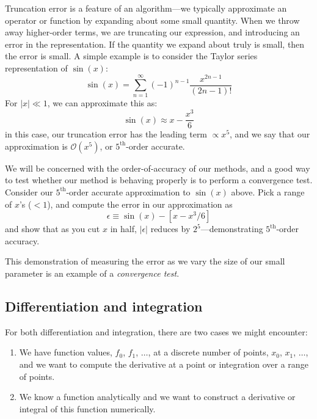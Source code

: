 Truncation error is a feature of an algorithm---we typically
approximate an operator or function by expanding about some small
quantity.  When we throw away higher-order terms, we are truncating
our expression, and introducing an error in the representation.  If
the quantity we expand about truly is small, then the error is small.
A simple example is to consider the Taylor series representation of
$\sin(x)$:
\begin{equation}
\sin(x) = \sum_{n=1}^\infty (-1)^{n-1} \frac{x^{2n-1}}{(2n-1)!}
\end{equation}
For $|x| \ll 1$, we can approximate this as:
\begin{equation}
\sin(x) \approx x - \frac{x^3}{6}
\end{equation}
in this case, our truncation error has the leading term $\propto x^5$,
and we say that our approximation is $\mathcal{O}(x^5)$, or
$5^\mathrm{th}$-order accurate.

\begin{exercise}
We will be concerned with the order-of-accuracy of our methods, and a
good way to test whether our method is behaving properly is to perform
a convergence test.  Consider our $5^\mathrm{th}$-order accurate
approximation to $\sin(x)$ above.  Pick a range of $x$'s ($< 1$), and
compute the error in our approximation as
\begin{equation*}
\epsilon \equiv \sin(x) - [  x - x^3/6 ]
\end{equation*}
and show that as you cut $x$ in half, $|\epsilon|$
reduces by $2^5$---demonstrating $5^\mathrm{th}$-order accuracy.
\end{exercise}

This demonstration of measuring the error as we vary the size
of our small parameter is an example of a {\em convergence test}.

\subsection{Differentiation and integration}

For both differentiation and integration, there are two cases we might
encounter:
\begin{enumerate}
\item We have function values, $f_0$, $f_1$, $\ldots$, at a discrete
  number of points, $x_0$, $x_1$, $\ldots$, and we want to compute the
  derivative at a point or integration over a range of points.
\item We know a function analytically and we want to construct a
  derivative or integral of this function numerically. 
\end{enumerate}

